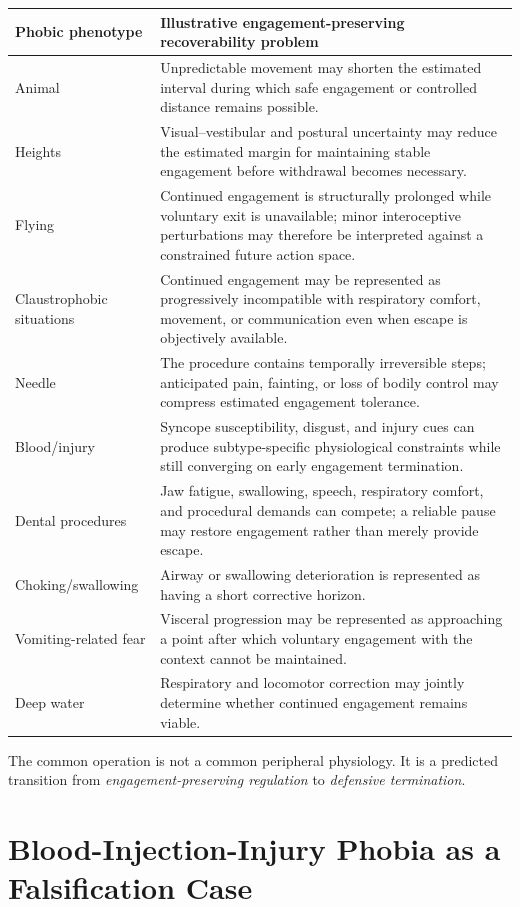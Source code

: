 \documentclass[11pt]{article}
\begin{document}
\begin{longtable}{p{}p{}}
\toprule
\textbf{Phobic phenotype} & \textbf{Illustrative engagement-preserving recoverability problem} \\
\midrule
Animal & Unpredictable movement may shorten the estimated interval during which safe engagement or controlled distance remains possible. \\
Heights & Visual--vestibular and postural uncertainty may reduce the estimated margin for maintaining stable engagement before withdrawal becomes necessary. \\
Flying & Continued engagement is structurally prolonged while voluntary exit is unavailable; minor interoceptive perturbations may therefore be interpreted against a constrained future action space. \\
Claustrophobic situations & Continued engagement may be represented as progressively incompatible with respiratory comfort, movement, or communication even when escape is objectively available. \\
Needle & The procedure contains temporally irreversible steps; anticipated pain, fainting, or loss of bodily control may compress estimated engagement tolerance. \\
Blood/injury & Syncope susceptibility, disgust, and injury cues can produce subtype-specific physiological constraints while still converging on early engagement termination. \\
Dental procedures & Jaw fatigue, swallowing, speech, respiratory comfort, and procedural demands can compete; a reliable pause may restore engagement rather than merely provide escape. \\
Choking/swallowing & Airway or swallowing deterioration is represented as having a short corrective horizon. \\
Vomiting-related fear & Visceral progression may be represented as approaching a point after which voluntary engagement with the context cannot be maintained. \\
Deep water & Respiratory and locomotor correction may jointly determine whether continued engagement remains viable. \\
\bottomrule
\end{longtable}

The common operation is not a common peripheral physiology. It is a predicted transition from \emph{engagement-preserving regulation} to \emph{defensive termination}.

\section{Blood-Injection-Injury Phobia as a Falsification Case}
\end{document}
